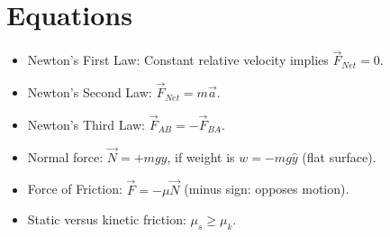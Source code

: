 \documentclass[10pt]{article}
\begin{document}
\maketitle

\section{Equations}
\begin{itemize}
\item Newton's First Law: Constant relative velocity implies $\vec{F}_{Net} = 0$.
\item Newton's Second Law: $\vec{F}_{Net} = m \vec{a}$.
\item Newton's Third Law: $\vec{F}_{AB} = -\vec{F}_{BA}$.
\item Normal force: $\vec{N} = +mg\hat{y}$, if weight is $w = -mg\hat{y}$ (flat surface).
\item Force of Friction: $\vec{F} = -\mu \vec{N}$ (minus sign: opposes motion).
\item Static versus kinetic friction: $\mu_s \geq \mu_k$.
\end{itemize}
\end{document}
